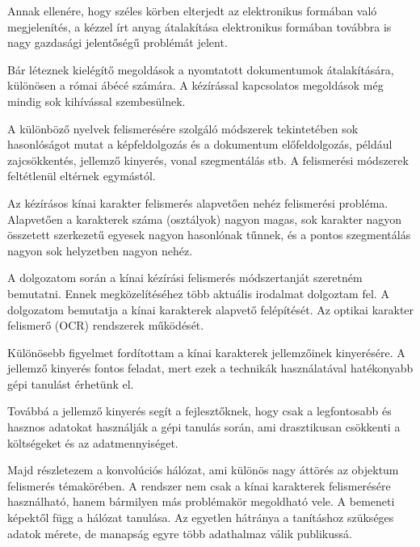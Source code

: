 

Annak ellenére, hogy széles körben elterjedt az elektronikus formában való megjelenítés, a kézzel írt anyag átalakítása elektronikus formában továbbra is nagy gazdasági jelentőségű problémát jelent.

Bár léteznek kielégítő megoldások a nyomtatott dokumentumok átalakítására, különösen a római ábécé számára. A kézírással kapcsolatos megoldások még mindig sok kihívással szembesülnek. 

A különböző nyelvek felismerésére szolgáló módszerek tekintetében sok hasonlóságot mutat a képfeldolgozás és a dokumentum előfeldolgozás, például zajcsökkentés, jellemző kinyerés, vonal szegmentálás stb. A felismerési módszerek feltétlenül eltérnek egymástól.

Az kézírásos kínai karakter felismerés alapvetően nehéz felismerési probléma. Alapvetően a karakterek száma (osztályok) nagyon magas, sok karakter nagyon összetett szerkezetű egyesek nagyon hasonlónak tűnnek, és a pontos szegmentálás nagyon sok helyzetben nagyon nehéz.

A dolgozatom során a kínai kézírási felismerés módszertanját szeretném bemutatni. Ennek megközelítéséhez több aktuális irodalmat dolgoztam fel. A dolgozatom bemutatja a kínai karakterek alapvető felépítését. Az optikai karakter felismerő (OCR) rendszerek működését.

Különösebb figyelmet fordítottam a kínai karakterek jellemzőinek kinyerésére. A jellemző kinyerés fontos feladat, mert ezek a technikák használatával hatékonyabb gépi tanulást érhetünk el.

Továbbá a jellemző kinyerés segít a fejlesztőknek, hogy csak a legfontosabb és hasznos adatokat használják a gépi tanulás során, ami drasztikusan csökkenti a költségeket és az adatmennyiséget.

Majd részletezem a konvolúciós hálózat, ami különös nagy áttörés az objektum felismerés témakörében. A rendszer nem csak a kínai karakterek felismerésére használható, hanem bármilyen más problémakör megoldható vele. A bemeneti képektől függ a hálózat tanulása. Az egyetlen hátránya a tanításhoz szükséges adatok mérete, de manapság egyre több adathalmaz válik publikussá.